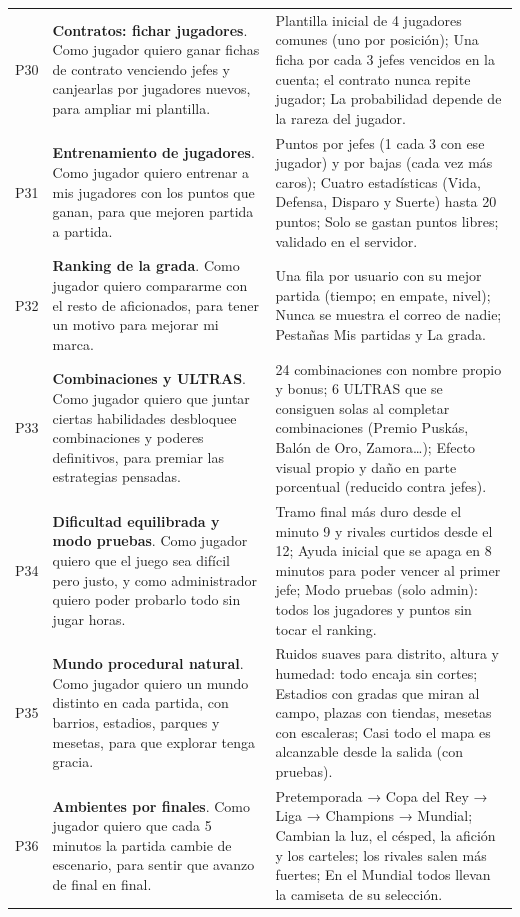 {\begin{longtable}{@{}L{0.8cm} L{6.4cm} L{6.6cm}@{}}
P30 & \textbf{Contratos: fichar jugadores}. Como jugador quiero ganar fichas de contrato venciendo jefes y canjearlas por jugadores nuevos, para ampliar mi plantilla. & Plantilla inicial de 4 jugadores comunes (uno por posición); Una ficha por cada 3 jefes vencidos en la cuenta; el contrato nunca repite jugador; La probabilidad depende de la rareza del jugador. \\
P31 & \textbf{Entrenamiento de jugadores}. Como jugador quiero entrenar a mis jugadores con los puntos que ganan, para que mejoren partida a partida. & Puntos por jefes (1 cada 3 con ese jugador) y por bajas (cada vez más caros); Cuatro estadísticas (Vida, Defensa, Disparo y Suerte) hasta 20 puntos; Solo se gastan puntos libres; validado en el servidor. \\
P32 & \textbf{Ranking de la grada}. Como jugador quiero compararme con el resto de aficionados, para tener un motivo para mejorar mi marca. & Una fila por usuario con su mejor partida (tiempo; en empate, nivel); Nunca se muestra el correo de nadie; Pestañas Mis partidas y La grada. \\
P33 & \textbf{Combinaciones y ULTRAS}. Como jugador quiero que juntar ciertas habilidades desbloquee combinaciones y poderes definitivos, para premiar las estrategias pensadas. & 24 combinaciones con nombre propio y bonus; 6 ULTRAS que se consiguen solas al completar combinaciones (Premio Puskás, Balón de Oro, Zamora…); Efecto visual propio y daño en parte porcentual (reducido contra jefes). \\
P34 & \textbf{Dificultad equilibrada y modo pruebas}. Como jugador quiero que el juego sea difícil pero justo, y como administrador quiero poder probarlo todo sin jugar horas. & Tramo final más duro desde el minuto 9 y rivales curtidos desde el 12; Ayuda inicial que se apaga en 8 minutos para poder vencer al primer jefe; Modo pruebas (solo admin): todos los jugadores y puntos sin tocar el ranking. \\
P35 & \textbf{Mundo procedural natural}. Como jugador quiero un mundo distinto en cada partida, con barrios, estadios, parques y mesetas, para que explorar tenga gracia. & Ruidos suaves para distrito, altura y humedad: todo encaja sin cortes; Estadios con gradas que miran al campo, plazas con tiendas, mesetas con escaleras; Casi todo el mapa es alcanzable desde la salida (con pruebas). \\
P36 & \textbf{Ambientes por finales}. Como jugador quiero que cada 5 minutos la partida cambie de escenario, para sentir que avanzo de final en final. & Pretemporada → Copa del Rey → Liga → Champions → Mundial; Cambian la luz, el césped, la afición y los carteles; los rivales salen más fuertes; En el Mundial todos llevan la camiseta de su selección. \\

\end{longtable}}
